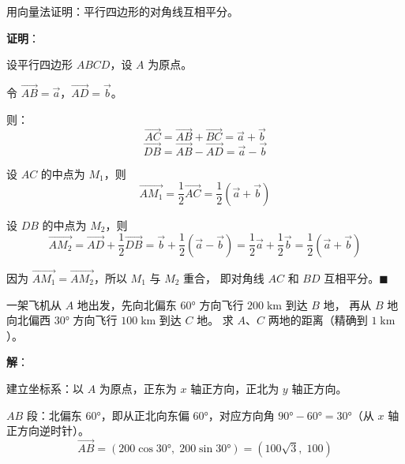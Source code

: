 \documentclass[12pt, a4paper]{ctexart}
\begin{document}
\begin{appbox}[【应用3】向量法证明几何定理]
用向量法证明：平行四边形的对角线互相平分。
\end{appbox}

\textbf{证明}：

设平行四边形 $ABCD$，设 $A$ 为原点。

令 $\overrightarrow{AB}=\vec{a}$，$\overrightarrow{AD}=\vec{b}$。

则：
\[
\overrightarrow{AC} = \overrightarrow{AB} + \overrightarrow{BC} = \vec{a} + \vec{b}
\]
\[
\overrightarrow{DB} = \overrightarrow{AB} - \overrightarrow{AD} = \vec{a} - \vec{b}
\]

设 $AC$ 的中点为 $M_1$，则
\[
\overrightarrow{AM_1} = \frac{1}{2}\overrightarrow{AC} = \frac{1}{2}(\vec{a}+\vec{b})
\]

设 $DB$ 的中点为 $M_2$，则
\[
\overrightarrow{AM_2} = \overrightarrow{AD} + \frac{1}{2}\overrightarrow{DB}
= \vec{b} + \frac{1}{2}(\vec{a}-\vec{b}) = \frac{1}{2}\vec{a} + \frac{1}{2}\vec{b}
= \frac{1}{2}(\vec{a}+\vec{b})
\]

因为 $\overrightarrow{AM_1} = \overrightarrow{AM_2}$，所以 $M_1$ 与 $M_2$ 重合，
即对角线 $AC$ 和 $BD$ 互相平分。$\blacksquare$

\begin{center}
\end{center}

\begin{appbox}[【应用4】导航与位移]
一架飞机从 $A$ 地出发，先向北偏东 $60°$ 方向飞行 $200\;\text{km}$ 到达 $B$ 地，
再从 $B$ 地向北偏西 $30°$ 方向飞行 $100\;\text{km}$ 到达 $C$ 地。
求 $A$、$C$ 两地的距离（精确到 $1\;\text{km}$）。
\end{appbox}

\textbf{解}：

建立坐标系：以 $A$ 为原点，正东为 $x$ 轴正方向，正北为 $y$ 轴正方向。

$AB$ 段：北偏东 $60°$，即从正北向东偏 $60°$，对应方向角 $90°-60°=30°$（从 $x$ 轴正方向逆时针）。
\[
\overrightarrow{AB} = (200\cos 30°,\; 200\sin 30°) = (100\sqrt{3},\; 100)
\]
\end{document}
